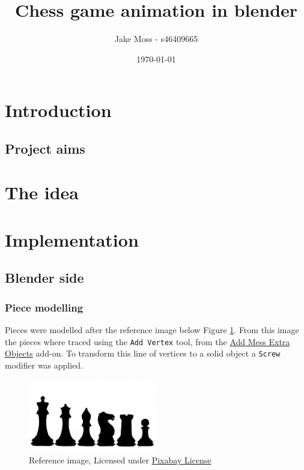 \documentclass[11pt]{article}
\author{Jake Moss - s46409665}
\date{\today}
\title{Chess game animation in blender}
\begin{document}
\maketitle
\tableofcontents

\newpage

\section{Introduction}
\label{sec:orgf6461a5}
\subsection{Project aims}
\label{sec:org4c663ca}
\section{The idea}
\label{sec:org375cbe3}
\section{Implementation}
\label{sec:org5b1f7f0}
\subsection{Blender side}
\label{sec:org77210c7}
\subsubsection{Piece modelling}
\label{sec:org3ab0387}
Pieces were modelled after the reference image below Figure \ref{piece-reference}. From this image the pieces where traced using the \texttt{Add Vertex} tool, from the \href{https://docs.blender.org/manual/en/2.92/addons/add\_mesh/mesh\_extra\_objects.html}{Add Mess Extra Objects} add-on. To transform this line of vertices to a solid object  a \texttt{Screw} modifier was applied.
\begin{figure}[htbp]
\centering
\includegraphics[width=0.5\textwidth]{ref/bee5aa3d08a30da4ca1005cbd0fe10b54a03bb49.jpg}
\caption{\label{piece-reference}Reference image, Licensed under \href{https://pixabay.com/service/license/}{Pixabay License}}
\end{figure}
\end{document}
